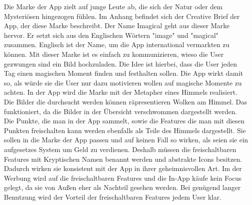 Die Marke der App zielt auf junge Leute ab, die sich der Natur oder dem Mysteriösen hingezogen fühlen. Im Anhang befindet sich der Creative Brief der App, der diese Marke beschreibt.
Der Name Imagical geht aus dieser Marke hervor. Er setzt sich aus den Englischen Wörtern "image" und "magical" zusammen. Englisch ist der Name, um die App international vermarkten zu können.
Mit dieser Marke ist es einfach zu kommunizieren, wieso die User gezwungen sind ein Bild hochzuladen. Die Idee ist hierbei, dass die User jeden Tag einen magischen Moment finden und festhalten sollen. Die App wirkt damit so, als würde sie die User nur dazu motivieren wollen auf magische Momente zu achten.
In der App wird die Marke mit der Metapher eines Himmels realisiert. Die Bilder die durchsucht werden können räpresentieren Wolken am Himmel. Das funktioniert, da die Bilder in der Übersicht verschwommen dargestellt werden. Die Punkte, die man in der App sammelt, sowie die Features die man mit diesen Punkten freischalten kann werden ebenfalls als Teile des Himmels dargestellt. Sie sollen in die Marke der App passen und auf keinen Fall so wirken, als seien sie ein aufgesetzes System um Geld zu verdienen. Deshalb müssen die freischaltbaren Features mit Kryptischen Namen benannt werden und abstrakte Icons besitzen. Dadurch wirken sie konsistent mit der App in ihrer geheimnisvollen Art.
Im der Werbung wird auf die freischaltbaren Features und die In-App käufe kein Focus gelegt, da sie von Außen eher als Nachteil gesehen werden. Bei genügend langer Benutzung wird der Vorteil der freischaltbaren Features jedem User klar.


